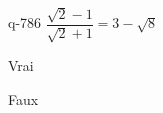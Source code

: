 \begin{truefalse}{q-786}
$\dfrac{\sqrt{2}-1}{\sqrt{2}+1} = 3-\sqrt{8}$
\item* Vrai
\item Faux
\end{truefalse}

